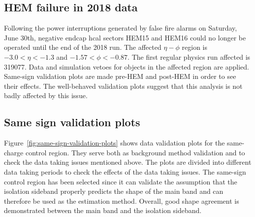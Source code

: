 \subsection{HEM failure in 2018 data}

Following the power interruptions generated by false fire alarms on Saturday, June 30th, negative endcap \gls{hcal} sectors HEM15 and HEM16 could no longer be operated until the end of the 2018 run. The affected $\eta-\phi$ region is $-3.0<\eta<-1.3$ and $-1.57<\phi<-0.87$. The first regular physics run affected is 319077. Data and simulation vetoes for objects in the affected region are applied. Same-sign validation plots are made pre-HEM and post-HEM in order to see their effects. The well-behaved validation plots suggest that this analysis is not badly affected by this issue.

\subsection{Same sign validation plots}
\label{sec:same-sign-validation-plots}

Figure~\ref{fig:same-sign-validation-plots} shows data validation plots for the same-charge control region. They serve both as background method validation and to check the data taking issues mentioned above. The plots are divided into different data taking periods to check the effects of the data taking issues. The same-sign control region has been selected since it can validate the assumption that the isolation sideband properly predicts the shape of the main band and can therefore be used as the estimation method. Overall, good shape agreement is demonstrated between the main band and the isolation sideband.

